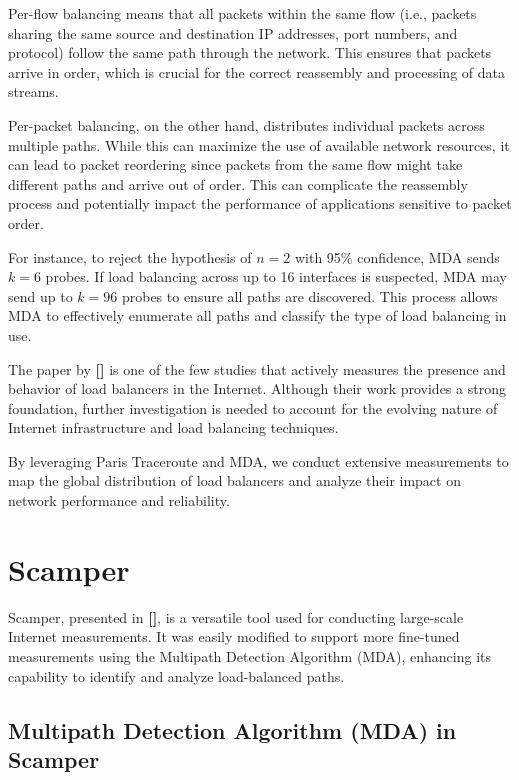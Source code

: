 \documentclass[12pt]{cwru_thesis}
\begin{document}
Per-flow balancing means that all packets within the same flow (i.e., packets sharing the same source and destination IP addresses, port numbers, and protocol) follow the same path through the network. This ensures that packets arrive in order, which is crucial for the correct reassembly and processing of data streams.

Per-packet balancing, on the other hand, distributes individual packets across multiple paths. While this can maximize the use of available network resources, it can lead to packet reordering since packets from the same flow might take different paths and arrive out of order. This can complicate the reassembly process and potentially impact the performance of applications sensitive to packet order.


For instance, to reject the hypothesis of \(n = 2\) with 95\% confidence, MDA sends \(k = 6\) probes. If load balancing across up to 16 interfaces is suspected, MDA may send up to \(k = 96\) probes to ensure all paths are discovered. This process allows MDA to effectively enumerate all paths and classify the type of load balancing in use.


The paper by \textbf{[\cite{4261334}]} is one of the few studies that actively measures the presence and behavior of load balancers in the Internet. Although their work provides a strong foundation, further investigation is needed to account for the evolving nature of Internet infrastructure and load balancing techniques.

By leveraging Paris Traceroute and MDA, we conduct extensive measurements to map the global distribution of load balancers and analyze their impact on network performance and reliability.


\section{Scamper}

Scamper, presented in \textbf{[\cite{luckie2010scamper}]}, is a versatile tool used for conducting large-scale Internet measurements. It was easily modified to support more fine-tuned measurements using the Multipath Detection Algorithm (MDA), enhancing its capability to identify and analyze load-balanced paths.



\subsection{Multipath Detection Algorithm (MDA) in Scamper}
\end{document}
